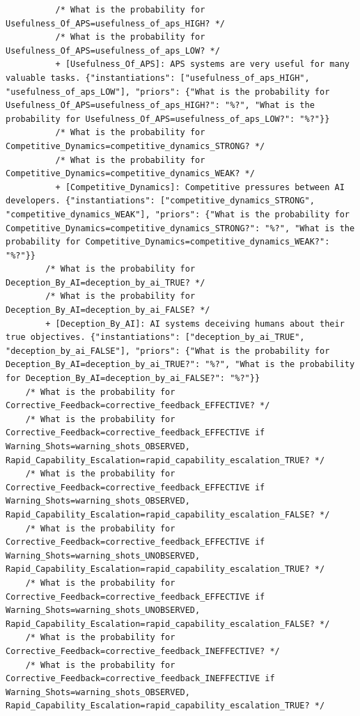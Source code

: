\documentclass[
  11pt,
  letterpaper,
]{book}
\begin{document}
\begin{landscape}
\begin{verbatim}
          /* What is the probability for Usefulness_Of_APS=usefulness_of_aps_HIGH? */
          /* What is the probability for Usefulness_Of_APS=usefulness_of_aps_LOW? */
          + [Usefulness_Of_APS]: APS systems are very useful for many valuable tasks. {"instantiations": ["usefulness_of_aps_HIGH", "usefulness_of_aps_LOW"], "priors": {"What is the probability for Usefulness_Of_APS=usefulness_of_aps_HIGH?": "%?", "What is the probability for Usefulness_Of_APS=usefulness_of_aps_LOW?": "%?"}}
          /* What is the probability for Competitive_Dynamics=competitive_dynamics_STRONG? */
          /* What is the probability for Competitive_Dynamics=competitive_dynamics_WEAK? */
          + [Competitive_Dynamics]: Competitive pressures between AI developers. {"instantiations": ["competitive_dynamics_STRONG", "competitive_dynamics_WEAK"], "priors": {"What is the probability for Competitive_Dynamics=competitive_dynamics_STRONG?": "%?", "What is the probability for Competitive_Dynamics=competitive_dynamics_WEAK?": "%?"}}
        /* What is the probability for Deception_By_AI=deception_by_ai_TRUE? */
        /* What is the probability for Deception_By_AI=deception_by_ai_FALSE? */
        + [Deception_By_AI]: AI systems deceiving humans about their true objectives. {"instantiations": ["deception_by_ai_TRUE", "deception_by_ai_FALSE"], "priors": {"What is the probability for Deception_By_AI=deception_by_ai_TRUE?": "%?", "What is the probability for Deception_By_AI=deception_by_ai_FALSE?": "%?"}}
    /* What is the probability for Corrective_Feedback=corrective_feedback_EFFECTIVE? */
    /* What is the probability for Corrective_Feedback=corrective_feedback_EFFECTIVE if Warning_Shots=warning_shots_OBSERVED, Rapid_Capability_Escalation=rapid_capability_escalation_TRUE? */
    /* What is the probability for Corrective_Feedback=corrective_feedback_EFFECTIVE if Warning_Shots=warning_shots_OBSERVED, Rapid_Capability_Escalation=rapid_capability_escalation_FALSE? */
    /* What is the probability for Corrective_Feedback=corrective_feedback_EFFECTIVE if Warning_Shots=warning_shots_UNOBSERVED, Rapid_Capability_Escalation=rapid_capability_escalation_TRUE? */
    /* What is the probability for Corrective_Feedback=corrective_feedback_EFFECTIVE if Warning_Shots=warning_shots_UNOBSERVED, Rapid_Capability_Escalation=rapid_capability_escalation_FALSE? */
    /* What is the probability for Corrective_Feedback=corrective_feedback_INEFFECTIVE? */
    /* What is the probability for Corrective_Feedback=corrective_feedback_INEFFECTIVE if Warning_Shots=warning_shots_OBSERVED, Rapid_Capability_Escalation=rapid_capability_escalation_TRUE? */

\end{verbatim}
\end{landscape}
\end{document}
